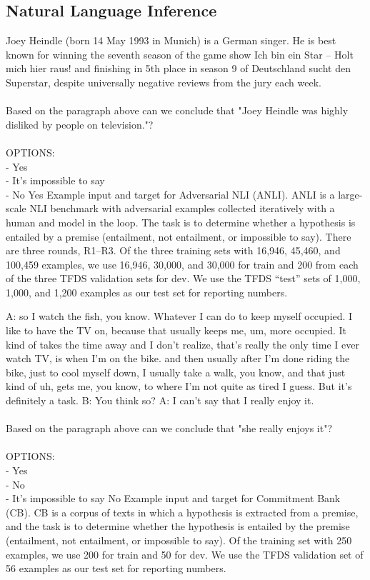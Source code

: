 \newcommand{\taskdescription}[8]{Example input and target for #1 (#2). #2 #3 #4. Of the #5, we use #6 for train and #7 for dev. We use #8 as our test set for reporting numbers.}

\clearpage 
\subsection{Natural Language Inference}\label{appen:b-nli}

\taskio
{Joey Heindle (born 14 May 1993 in Munich) is a German singer. He is best known for winning the seventh season of the game show Ich bin ein Star – Holt mich hier raus! and finishing in 5th place in season 9 of Deutschland sucht den Superstar, despite universally negative reviews from the jury each week.\\\\Based on the paragraph above can we conclude that "Joey Heindle was highly disliked by people on television."?\\\\OPTIONS:\\- Yes\\- It's impossible to say\\- No}
{Yes}
{   \taskdescription
    {Adversarial NLI} %
    {ANLI} %
    {\citep{anli}} %
    {is a large-scale NLI benchmark with adversarial examples collected iteratively with a human and model in the loop. The task is to determine whether a hypothesis is entailed by a premise (entailment, not entailment, or impossible to say). There are three rounds, R1--R3} %
    {three training sets with 16,946, 45,460, and 100,459 examples} %
    {16,946, 30,000, and 30,000} %
    {200 from each of the three TFDS validation sets} %
    {the TFDS ``test'' sets of 1,000, 1,000, and 1,200 examples} %
}

\taskio
{A: so I watch the fish, you know. Whatever I can do to keep myself occupied. I like to have the TV on, because that usually keeps me, um, more occupied. It kind of takes the time away and I don't realize, that's really the only time I ever watch TV, is when I'm on the bike. and then usually after I'm done riding the bike, just to cool myself down, I usually take a walk, you know, and that just kind of uh, gets me, you know, to where I'm not quite as tired I guess. But it's definitely a task. B: You think so? A: I can't say that I really enjoy it.\\\\Based on the paragraph above can we conclude that "she really enjoys it"?\\\\OPTIONS:\\- Yes\\- No\\- It's impossible to say}
{No}
{
    \taskdescription
    {Commitment Bank} %
    {CB} %
    {\citep{de2019commitmentbank}} %
    {is a corpus of texts in which a hypothesis is extracted from a premise, and the task is to determine whether the hypothesis is entailed by the premise (entailment, not entailment, or impossible to say)} %
    {training set with 250 examples} %
    {200} %
    {50} %
    {the TFDS validation set of 56 examples} %
}

